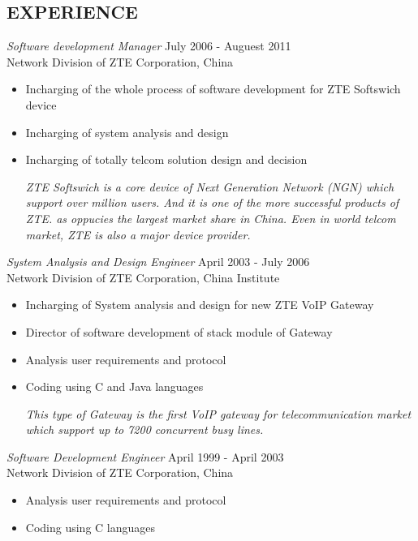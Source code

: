 \documentclass[margin]{res}
\begin{document}
\begin{resume}
\section{EXPERIENCE} 
                {\sl Software development Manager} \hfill July 2006 - Auguest 2011 \\
                Network Division of ZTE Corporation, China
                 \begin{itemize}  \itemsep -2pt %
                 \item Incharging of the whole process of software development for ZTE Softswich
                   device
                 \item Incharging of system analysis and design
                 \item Incharging of totally telcom solution design and decision

{\it
                   ZTE Softswich is a core device of Next Generation Network (NGN) which support
                   over million users. And it is one of the more successful products of ZTE. as
                   oppucies the largest market share in China. Even in world telcom market, ZTE is
                   also a major device provider.
}
                \end{itemize}
 
                {\sl System Analysis and Design Engineer} \hfill  April 2003 - July 2006 \\
                Network Division of ZTE Corporation, China
                Institute 
                 \begin{itemize}  \itemsep -2pt %
                 \item Incharging of System analysis and design for new ZTE VoIP Gateway
                 \item Director of software development of stack module of Gateway
                 \item Analysis user requirements and protocol
                 \item Coding using C and Java languages

                   {\it This type of Gateway is the first VoIP gateway for telecommunication market
                     which support up to 7200 concurrent busy lines. }

                 \end{itemize} 

                {\sl Software Development Engineer} \hfill        April 1999 - April 2003 \\
                Network Division of ZTE Corporation, China
                  \begin{itemize}
                   \item Analysis user requirements and protocol
                   \item Coding using C languages


\end{itemize}
\end{resume}
\end{document}
